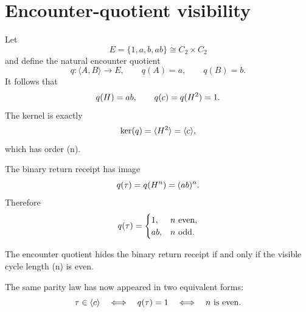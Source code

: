 \section{Encounter-quotient visibility}

Let
\[
E=\{1,a,b,ab\}\cong C_2\times C_2
\]
and define the natural encounter quotient
\[
q:\langle A,B\rangle\longrightarrow E,
\qquad
q(A)=a,
\qquad
q(B)=b.
\]
It follows that
\[
q(H)=ab,
\qquad
q(c)=q(H^2)=1.
\]
The kernel is exactly
\[
\operatorname{ker}(q)=\langle H^2\rangle=\langle c\rangle,
\]
which has order (n).

The binary return receipt has image
\[
q(\tau)=q(H^n)=(ab)^n.
\]
Therefore
\[
q(\tau)=
\begin{cases}
1, & n\text{ even},\\
ab, & n\text{ odd}.
\end{cases}
\]

\begin{proposition}
The encounter quotient hides the binary return receipt if and only if the
visible cycle length (n) is even.
\end{proposition}

The same parity law has now appeared in two equivalent forms:
\[
\tau\in\langle c\rangle
\quad\Longleftrightarrow\quad
q(\tau)=1
\quad\Longleftrightarrow\quad
n\text{ is even}.
\]

